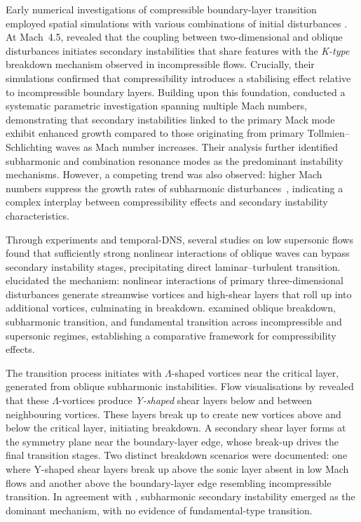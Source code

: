 Early numerical investigations of compressible boundary-layer transition employed spatial simulations with various combinations of initial disturbances \citep{ThummWolzFasel1989}. At Mach~4.5, \citet{Erlebacher1990} revealed that the coupling between two-dimensional and oblique disturbances initiates secondary instabilities that share features with the \textit{K-type} breakdown mechanism observed in incompressible flows. Crucially, their simulations confirmed that compressibility introduces a stabilising effect relative to incompressible boundary layers. Building upon this foundation, \citet{NgErlebacher1992} conducted a systematic parametric investigation spanning multiple Mach numbers, demonstrating that secondary instabilities linked to the primary Mack mode exhibit enhanced growth compared to those originating from primary Tollmien--Schlichting waves as Mach number increases. Their analysis further identified subharmonic and combination resonance modes as the predominant instability mechanisms. However, a competing trend was also observed: higher Mach numbers suppress the growth rates of subharmonic disturbances~\citep{MasadNayfeh1990,NgErlebacher1992,ElHady1992}, indicating a complex interplay between compressibility effects and secondary instability characteristics.


Through experiments and temporal-\gls{DNS}, several studies on low supersonic flows~\citep{KosinovMaslovShevelkov1990,Fasel1993,SandhamAdams1993,ChangMalik1994} found that sufficiently strong nonlinear interactions of oblique waves can bypass secondary instability stages, precipitating direct laminar--turbulent transition. \citet{SandhamAdamsKleiser1995} elucidated the mechanism: nonlinear interactions of primary three-dimensional disturbances generate streamwise vortices and high-shear layers that roll up into additional vortices, culminating in breakdown. \citet{SchmidHenningson2001} examined oblique breakdown, subharmonic transition, and fundamental transition across incompressible and supersonic regimes, establishing a comparative framework for compressibility effects.

The transition process initiates with $\Lambda$-shaped vortices near the critical layer, generated from oblique subharmonic instabilities. Flow visualisations by \citet{AdamsKleiser1996} revealed that these $\Lambda$-vortices produce \textit{Y-shaped} shear layers below and between neighbouring vortices. These layers break up to create new vortices above and below the critical layer, initiating breakdown. A secondary shear layer forms at the symmetry plane near the boundary-layer edge, whose break-up drives the final transition stages. Two distinct breakdown scenarios were documented: one where Y-shaped shear layers break up above the sonic layer absent in low Mach flows and another above the boundary-layer edge resembling incompressible transition. In agreement with \citet{NgErlebacher1992}, subharmonic secondary instability emerged as the dominant mechanism, with no evidence of fundamental-type transition.


